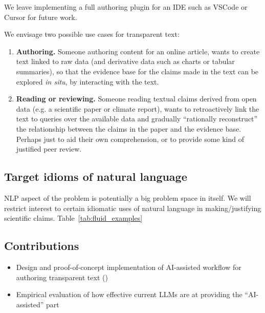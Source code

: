 We leave implementing a full authoring plugin for an IDE such as VSCode or Cursor for future work.

We envisage two possible use cases for transparent text:

\begin{enumerate}
\item \textbf{Authoring.} Someone authoring content for an online article, wants to create text
linked to raw data (and derivative data such as charts or tabular summaries), so that the evidence base for
the claims made in the text can be explored \emph{in situ}, by interacting with the text.

\item \textbf{Reading or reviewing.} Someone reading textual claims derived from open data (e.g. a
scientific paper or climate report), wants to retroactively link the text to queries over the available data
and gradually ``rationally reconstruct'' the relationship between the claims in the paper and the evidence
base. Perhaps just to aid their own comprehension, or to provide some kind of justified peer review.
\end{enumerate}



\subsection{Target idioms of natural language}

NLP aspect of the problem is potentially a big problem space in itself. We will restrict interest to certain
idiomatic uses of natural language in making/justifying scientific claims. Table~\ref{tab:fluid_examples}



\subsection{Contributions}

\begin{itemize}
    \item Design and proof-of-concept implementation of AI-assisted workflow for authoring transparent text
    ()
    \item Empirical evaluation of how effective current LLMs are at providing the ``AI-assisted'' part
\end{itemize}
